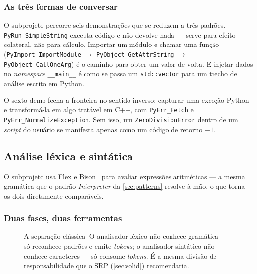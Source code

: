 \subsubsection{As três formas de conversar}

O subprojeto percorre seis demonstrações que se reduzem a três padrões.
\texttt{PyRun\_SimpleString} executa código e não devolve nada --- serve para
efeito colateral, não para cálculo. Importar um módulo e chamar uma função
(\texttt{PyImport\_ImportModule} $\rightarrow$ \texttt{PyObject\_GetAttrString}
$\rightarrow$ \texttt{PyObject\_CallOneArg}) é o caminho para obter um valor de
volta. E injetar dados no \emph{namespace} \texttt{\_\_main\_\_} é como se passa
um \texttt{std::vector} para um trecho de análise escrito em Python.

O sexto demo fecha a fronteira no sentido inverso: capturar uma exceção Python e
transformá-la em algo tratável em C++, com \texttt{PyErr\_Fetch} e
\texttt{PyErr\_NormalizeException}. Sem isso, um \texttt{ZeroDivisionError}
dentro de um \emph{script} do usuário se manifesta apenas como um código de
retorno $-1$.

\subsection{Análise léxica e sintática}
\label{sec:parser}

O subprojeto  usa Flex e Bison~\cite{levine2009} para avaliar
expressões aritméticas --- a mesma gramática que o padrão \emph{Interpreter} da
\cref{sec:patterns} resolve à mão, o que torna os dois diretamente comparáveis.

\subsubsection{Duas fases, duas ferramentas}

\begin{figure}[htbp]
\centering
{}
\caption{A separação clássica. O analisador léxico não conhece gramática --- só
         reconhece padrões e emite \emph{tokens}; o analisador sintático não
         conhece caracteres --- só consome \emph{tokens}. É a mesma divisão de
         responsabilidade que o SRP (\cref{sec:solid}) recomendaria.}
\label{fig:parser}
\end{figure}

